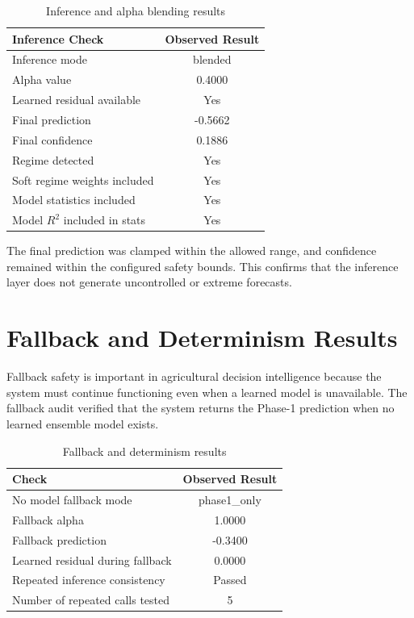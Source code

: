 \documentclass[12pt,a4paper]{report}
\begin{document}
\begin{table}[H]
\centering
\caption{Inference and alpha blending results}
\label{tab:alpha_blending_results}
\begin{tabular}{|p{6cm}|c|}
\hline
\textbf{Inference Check} & \textbf{Observed Result} \\
\hline
Inference mode & blended \\
\hline
Alpha value & 0.4000 \\
\hline
Learned residual available & Yes \\
\hline
Final prediction & -0.5662 \\
\hline
Final confidence & 0.1886 \\
\hline
Regime detected & Yes \\
\hline
Soft regime weights included & Yes \\
\hline
Model statistics included & Yes \\
\hline
Model $R^2$ included in stats & Yes \\
\hline
\end{tabular}
\end{table}

The final prediction was clamped within the allowed range, and confidence remained within the configured safety bounds. This confirms that the inference layer does not generate uncontrolled or extreme forecasts.

\section{Fallback and Determinism Results}

Fallback safety is important in agricultural decision intelligence because the system must continue functioning even when a learned model is unavailable. The fallback audit verified that the system returns the Phase-1 prediction when no learned ensemble model exists.

\begin{table}[H]
\centering
\caption{Fallback and determinism results}
\label{tab:fallback_results}
\begin{tabular}{|p{6cm}|c|}
\hline
\textbf{Check} & \textbf{Observed Result} \\
\hline
No model fallback mode & phase1\_only \\
\hline
Fallback alpha & 1.0000 \\
\hline
Fallback prediction & -0.3400 \\
\hline
Learned residual during fallback & 0.0000 \\
\hline
Repeated inference consistency & Passed \\
\hline
Number of repeated calls tested & 5 \\
\hline
\end{tabular}
\end{table}
\end{document}
